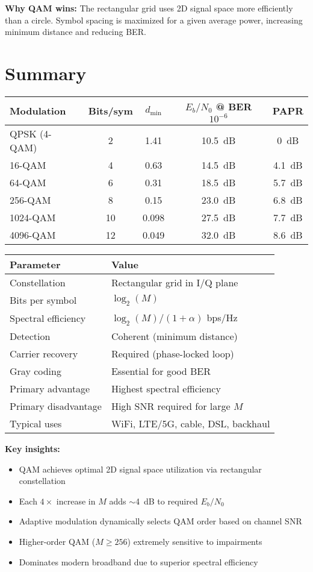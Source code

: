 \textbf{Why QAM wins:} The rectangular grid uses 2D signal space more efficiently than a circle. Symbol spacing is maximized for a given average power, increasing minimum distance and reducing BER.

\section{Summary}

\begin{center}
\begin{tabular}{@{}lcccc@{}}
\toprule
Modulation & Bits/sym & $d_{\min}$ & $E_b/N_0$ @ BER $10^{-6}$ & PAPR \\
\midrule
QPSK (4-QAM) & 2 & 1.41 & 10.5~dB & 0~dB \\
16-QAM & 4 & 0.63 & 14.5~dB & 4.1~dB \\
64-QAM & 6 & 0.31 & 18.5~dB & 5.7~dB \\
256-QAM & 8 & 0.15 & 23.0~dB & 6.8~dB \\
1024-QAM & 10 & 0.098 & 27.5~dB & 7.7~dB \\
4096-QAM & 12 & 0.049 & 32.0~dB & 8.6~dB \\
\bottomrule
\end{tabular}
\end{center}

\begin{center}
\begin{tabular}{@{}ll@{}}
\toprule
\textbf{Parameter} & \textbf{Value} \\
\midrule
Constellation & Rectangular grid in I/Q plane \\
Bits per symbol & $\log_2(M)$ \\
Spectral efficiency & $\log_2(M)/(1+\alpha)$ bps/Hz \\
Detection & Coherent (minimum distance) \\
Carrier recovery & Required (phase-locked loop) \\
Gray coding & Essential for good BER \\
Primary advantage & Highest spectral efficiency \\
Primary disadvantage & High SNR required for large $M$ \\
Typical uses & WiFi, LTE/5G, cable, DSL, backhaul \\
\bottomrule
\end{tabular}
\end{center}

\textbf{Key insights:}
\begin{itemize}
\item QAM achieves optimal 2D signal space utilization via rectangular constellation
\item Each $4\times$ increase in $M$ adds $\sim$4~dB to required $E_b/N_0$
\item Adaptive modulation dynamically selects QAM order based on channel SNR
\item Higher-order QAM ($M \geq 256$) extremely sensitive to impairments
\item Dominates modern broadband due to superior spectral efficiency
\end{itemize}

